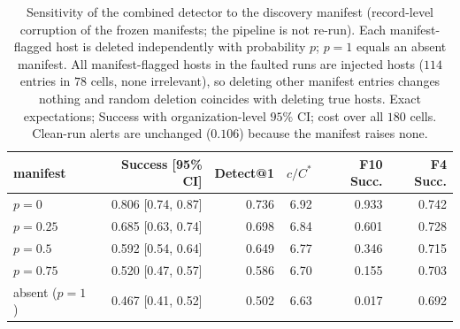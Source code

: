 \begin{table}[t]\centering\footnotesize
\caption{Sensitivity of the combined detector to the discovery manifest (record-level corruption of the frozen manifests; the pipeline is not re-run). Each manifest-flagged host is deleted independently with probability $p$; $p=1$ equals an absent manifest. All manifest-flagged hosts in the faulted runs are injected hosts ($114$ entries in $78$ cells, none irrelevant), so deleting other manifest entries changes nothing and random deletion coincides with deleting true hosts. Exact expectations; Success with organization-level $95\%$ CI; cost over all $180$ cells. Clean-run alerts are unchanged ($0.106$) because the manifest raises none.}
\label{tab:ec-manifest}
\begin{tabular}{lrrrrr}\toprule
manifest & Success [95\% CI] & Detect@1 & $c/C^\ast$ & F10 Succ. & F4 Succ.\\\midrule
$p=0$ & 0.806 [0.74, 0.87] & 0.736 & 6.92 & 0.933 & 0.742\\
$p=0.25$ & 0.685 [0.63, 0.74] & 0.698 & 6.84 & 0.601 & 0.728\\
$p=0.5$ & 0.592 [0.54, 0.64] & 0.649 & 6.77 & 0.346 & 0.715\\
$p=0.75$ & 0.520 [0.47, 0.57] & 0.586 & 6.70 & 0.155 & 0.703\\
absent ($p=1$) & 0.467 [0.41, 0.52] & 0.502 & 6.63 & 0.017 & 0.692\\
\bottomrule\end{tabular}\end{table}
